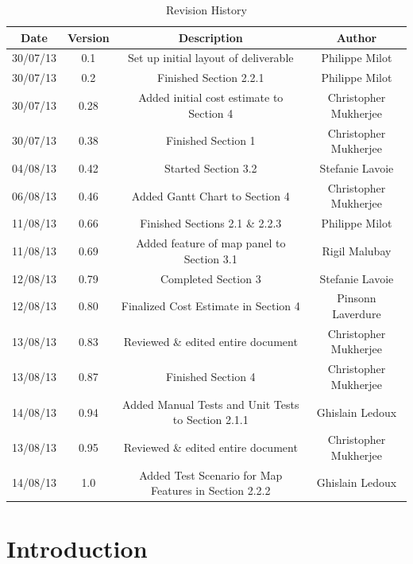 \documentclass{article}
\begin{document}
\begin{table}[htbp]
\caption{Revision History}
\begin{center}
\begin{tabular}{|c | c | c | c| }
\hline
Date & Version & Description & Author \\
\hline\hline
30/07/13 & 0.1 & Set up initial layout of deliverable & Philippe Milot \\
\hline
30/07/13 & 0.2 & Finished Section 2.2.1 & Philippe Milot \\
\hline
30/07/13 & 0.28 & Added initial cost estimate to Section 4 & Christopher Mukherjee \\
\hline
30/07/13 & 0.38 & Finished Section 1 & Christopher Mukherjee \\
\hline
04/08/13 & 0.42 & Started Section 3.2 & Stefanie Lavoie \\
\hline
06/08/13 & 0.46 & Added Gantt Chart to Section 4 & Christopher Mukherjee \\
\hline
11/08/13 & 0.66 & Finished Sections 2.1 \& 2.2.3 & Philippe Milot \\
\hline
11/08/13 & 0.69 & Added feature of map panel to Section 3.1 & Rigil Malubay \\
\hline
12/08/13 & 0.79 & Completed Section 3 & Stefanie Lavoie \\
\hline
12/08/13 & 0.80 & Finalized Cost Estimate in Section 4 & Pinsonn Laverdure \\
\hline
13/08/13 & 0.83 & Reviewed \& edited entire document & Christopher Mukherjee \\
\hline
13/08/13 & 0.87 & Finished Section 4 & Christopher Mukherjee \\
\hline
14/08/13 & 0.94 & Added Manual Tests and Unit Tests to Section 2.1.1 & Ghislain Ledoux \\
\hline
13/08/13 & 0.95 & Reviewed \& edited entire document & Christopher Mukherjee \\
\hline
14/08/13 & 1.0 & Added Test Scenario for Map Features in Section 2.2.2 & Ghislain Ledoux \\
\hline

\end{tabular}
\end{center}
\end{table}

\clearpage

\tableofcontents
\clearpage


{\color{royalbluedark}\section{Introduction}} %
\end{document}
